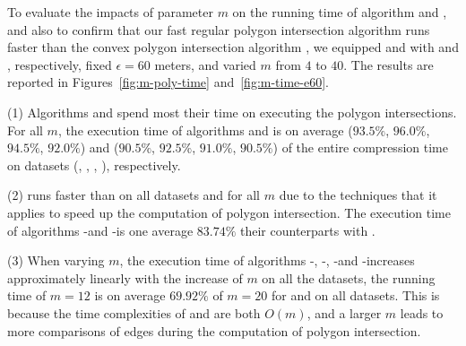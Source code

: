 {%
To evaluate the impacts of parameter $m$ on the running time of algorithm \cist and \cista,
 and also to confirm that our fast regular polygon intersection algorithm \rpia runs faster than the convex polygon intersection algorithm \cpia,
we equipped \cist and \cista with \rpia and \cpia, respectively, fixed $\epsilon =60$ meters, and varied $m$ from $4$ to $40$.
%
The results are reported in Figures~\ref{fig:m-poly-time} and~\ref{fig:m-time-e60}.

\ni(1) Algorithms \cist and \cista spend most their time on executing the
polygon intersections. For all $m$, the execution time of algorithms \cpia and
\rpia is on average {($93.5\%$, $96.0\%$, $94.5\%$, $92.0\%$)
	and ($90.5\%$, $92.5\%$, $91.0\%$, $90.5\%$)} of the entire compression  time on {datasets}
(\sercar, \geolife, \mopsi, \pricar), respectively.

\ni(2) \rpia runs faster than \cpia on all datasets and for all $m$ {due to the techniques that it applies to speed up
the computation of polygon intersection}. The execution time of algorithms \cist-\rpia and \cista-\rpia is one average $83.74\%$ their counterparts with \cpia.

\ni(3) When varying $m$, the execution time of algorithms \cist-\rpia, \cist-\cpia, \cista-\rpia and \cista-\cpia increases approximately linearly with the increase of $m$ on all the datasets, {\eg the running time of $m=12$ is on average $69.92\%$ of $m=20$ for \cist and \cista on all datasets. This is because the time complexities of \rpia and \cpia are both $O(m)$, and a larger $m$ leads to more comparisons of edges during the computation of  polygon intersection.}





}
